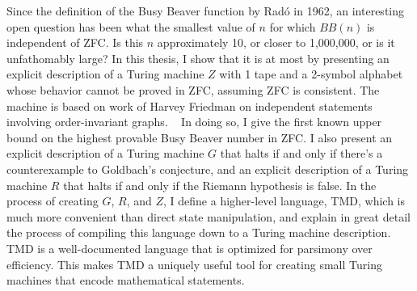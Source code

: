 % 
% 
%


Since the definition of the Busy Beaver function by Rad\'{o} in 1962, an interesting open question has been what the smallest value of $n$ for which $BB(n)$ is independent of ZFC. Is this $n$ approximately 10, or closer to 1,000,000, or is it unfathomably large? In this thesis, I show that it is at most \statenum by presenting an explicit description of a \statenumstate Turing machine $Z$ with 1 tape and a 2-symbol alphabet whose behavior cannot be proved in ZFC, assuming ZFC is consistent. The machine is based on work of Harvey Friedman on independent statements involving order-invariant graphs. \cite{friedman}~
In doing so, I give the first known upper bound on the highest provable Busy Beaver number in ZFC. I also present an explicit description of a \gbstatenumstate Turing machine $G$ that halts if and only if there's a counterexample to Goldbach's conjecture, and an explicit description of a \rmstatenumstate Turing machine $R$ that halts if and only if the Riemann hypothesis is false. In the process of creating $G$, $R$, and $Z$, I define a higher-level language, TMD, which is much more convenient than direct state manipulation, and explain in great detail the process of compiling this language down to a Turing machine description. TMD is a well-documented language that is optimized for parsimony over efficiency. This makes TMD a uniquely useful tool for creating small Turing machines that encode mathematical statements. 
